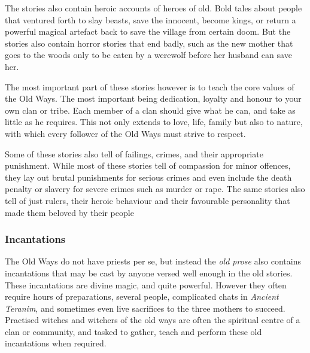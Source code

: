 The stories also contain heroic accounts of heroes of old. Bold tales about
people that ventured forth to slay beasts, save the innocent, become kings, or
return a powerful magical artefact back to save the village from certain doom.
But the stories also contain horror stories that end badly, such as the new
mother that goes to the woods only to be eaten by a werewolf before her
husband can save her.

The most important part of these stories however is to teach the core values of
the Old Ways. The most important being dedication, loyalty and honour to your
own clan or tribe. Each member of a clan should give what he can, and take as
little as he requires. This not only extends to love, life, family but also
to nature, with which every follower of the Old Ways must strive to respect.

Some of these stories also tell of failings, crimes, and their appropriate
punishment. While most of these stories tell of compassion for minor offences,
they lay out brutal punishments for serious crimes and even include the death
penalty or slavery for severe crimes such as murder or rape. The same stories
also tell of just rulers, their heroic behaviour and their favourable
personality that made them beloved by their people

\subsubsection*{Incantations}

The Old Ways do not have priests per se, but instead the \emph{old prose} also
contains incantations that may be cast by anyone versed well enough in the
old stories. These incantations are divine magic, and quite powerful. However
they often require hours of preparations, several people, complicated chats in
\emph{Ancient Teranim}, and sometimes even live sacrifices to the three
mothers to succeed. Practised witches and witchers of the old ways are often
the spiritual centre of a clan or community, and tasked to gather, teach and
perform these old incantations when required.

